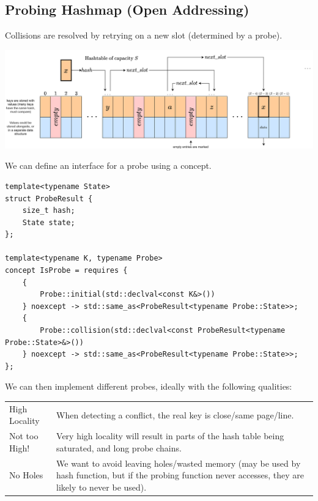 \subsection{Probing Hashmap (Open Addressing)}
Collisions are resolved by retrying on a new slot (determined by a probe).
\begin{center}
    \includegraphics[width=\textwidth]{algorithms_and_indices/images/hash_table.drawio.png}
\end{center}
We can define an interface for a probe using a concept.
\begin{verbatim}
template<typename State>
struct ProbeResult {
    size_t hash;
    State state;
};

template<typename K, typename Probe>
concept IsProbe = requires {
    { 
        Probe::initial(std::declval<const K&>()) 
    } noexcept -> std::same_as<ProbeResult<typename Probe::State>>;
    { 
        Probe::collision(std::declval<const ProbeResult<typename Probe::State>&>()) 
    } noexcept -> std::same_as<ProbeResult<typename Probe::State>>;
};
\end{verbatim}
We can then implement different probes, ideally with the following qualities:
\begin{center}
    \begin{tabular}{l p{}}
        High Locality & When detecting a conflict, the real key is close/same page/line.                                                                                           \\
        Not too High! & Very high locality will result in parts of the hash table being saturated, and long probe chains.                                                          \\
        No Holes      & We want to avoid leaving holes/wasted memory (may be used by hash function, but if the probing function never accesses, they are likely to never be used). \\
    \end{tabular}
\end{center}


